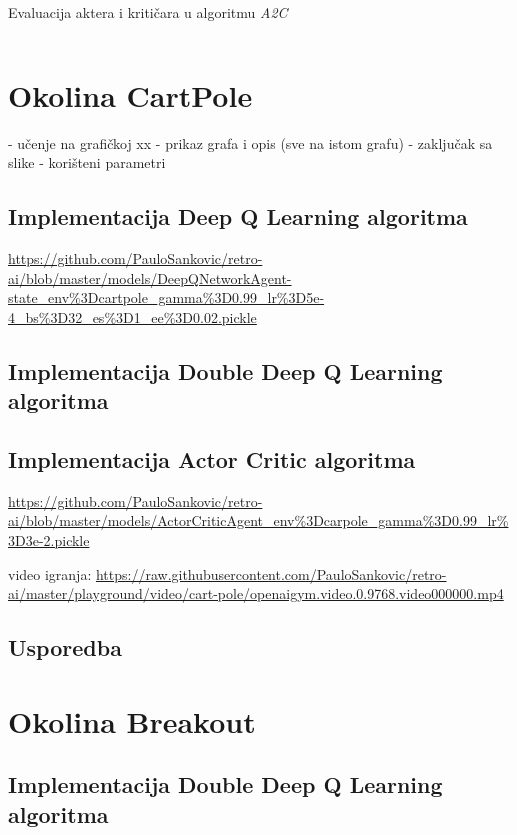 \begin{listing}[H]
    \caption{Evaluacija aktera i kritičara u algoritmu \textit{A2C}}
    \inputminted{python}{snippets/a2c-eval.py}
    \label{lst:a2c-eval}
\end{listing}

\section{Okolina CartPole}



- učenje na grafičkoj xx
- prikaz grafa i opis (sve na istom grafu)
- zaključak sa slike
- korišteni parametri

\subsection{Implementacija Deep Q Learning algoritma}

\url{https://github.com/PauloSankovic/retro-ai/blob/master/models/DeepQNetworkAgent-state_env\%3Dcartpole_gamma\%3D0.99_lr\%3D5e-4_bs\%3D32_es\%3D1_ee\%3D0.02.pickle}

\subsection{Implementacija Double Deep Q Learning algoritma}

\subsection{Implementacija Actor Critic algoritma}

\url{https://github.com/PauloSankovic/retro-ai/blob/master/models/ActorCriticAgent_env\%3Dcarpole_gamma\%3D0.99_lr\%3D3e-2.pickle}

video igranja:
\url{https://raw.githubusercontent.com/PauloSankovic/retro-ai/master/playground/video/cart-pole/openaigym.video.0.9768.video000000.mp4}

\subsection{Usporedba}

\section{Okolina Breakout}

\subsection{Implementacija Double Deep Q Learning algoritma}

